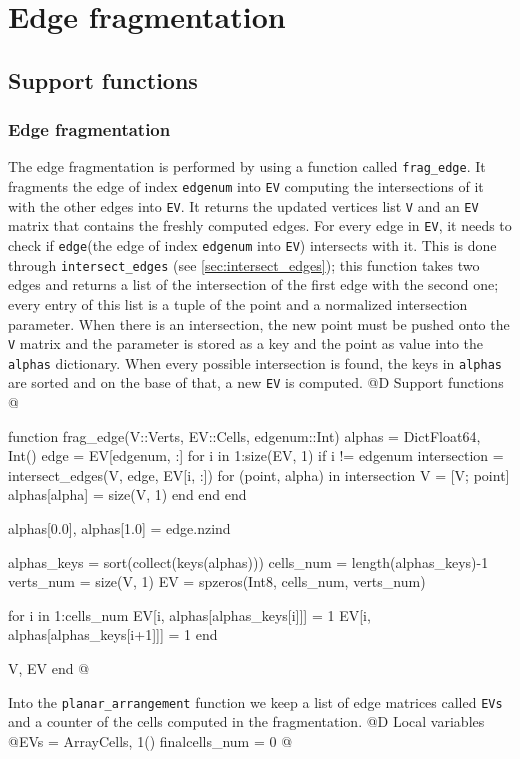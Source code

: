 \documentclass[10pt,oneside]{article}
\begin{document}
\section{Edge fragmentation}
\subsection{Support functions}
\subsubsection{Edge fragmentation}
\label{sec:frag_edge}
The edge fragmentation is performed by using a function called \texttt{frag\_edge}.
It fragments the edge of index \texttt{edgenum} into \texttt{EV} computing the intersections of
it with the other edges into \texttt{EV}. It returns the updated vertices list \texttt{V} and an 
\texttt{EV} matrix that contains the freshly computed edges.
For every edge in \texttt{EV}, it needs to check if \texttt{edge}(the edge of index \texttt{edgenum} into 
\texttt{EV}) intersects with it. This is done through \texttt{intersect\_edges} (see \ref{sec:intersect_edges}); 
this function takes two edges and returns a list of the intersection of the first edge with the second one; 
every entry of this list is a tuple of the point and a normalized intersection parameter. 
When there is an intersection, the new point must be pushed onto the \texttt{V} matrix and the parameter 
is stored as a key and the point as value into the \texttt{alphas} dictionary.
When every possible intersection is found, the keys in \texttt{alphas} are sorted and on the base of that,
a new \texttt{EV} is computed.
@D Support functions
@{function frag_edge(V::Verts, EV::Cells, edgenum::Int)
    alphas = Dict{Float64, Int}()
    edge = EV[edgenum, :]
    for i in 1:size(EV, 1)
        if i != edgenum
            intersection = intersect_edges(V, edge, EV[i, :])
            for (point, alpha) in intersection
                V = [V; point]
                alphas[alpha] = size(V, 1)
            end
        end
    end

    alphas[0.0], alphas[1.0] = edge.nzind

    alphas_keys = sort(collect(keys(alphas)))
    cells_num = length(alphas_keys)-1
    verts_num = size(V, 1)
    EV = spzeros(Int8, cells_num, verts_num)

    for i in 1:cells_num
        EV[i, alphas[alphas_keys[i]]] = 1
        EV[i, alphas[alphas_keys[i+1]]] = 1
    end

    V, EV
end
@}
Into the \texttt{planar\_arrangement} function we keep a list of edge matrices called \texttt{EVs} and
a counter of the cells computed in the fragmentation.
@D Local variables
@{EVs = Array{Cells, 1}()
finalcells_num = 0
@}
\end{document}
